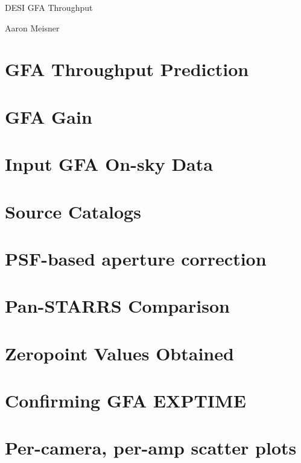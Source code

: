 \documentclass{article}
\begin{document}
\begin{center}
\Large
DESI GFA Throughput
\end{center}

\normalsize

\begin{center}
Aaron Meisner
\end{center}

\section{GFA Throughput Prediction}


\section{GFA Gain}



\section{Input GFA On-sky Data}


\section{Source Catalogs}

\section{PSF-based aperture correction}


\section{Pan-STARRS Comparison}

\section{Zeropoint Values Obtained}



\appendix

\section{Confirming GFA EXPTIME}

\section{Per-camera, per-amp scatter plots}
\end{document}
